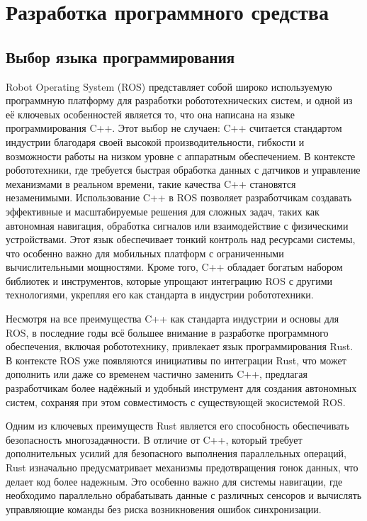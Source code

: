 \section{Разработка программного средства}

\subsection{Выбор языка программирования}
Robot Operating System (ROS) представляет собой широко используемую программную
платформу для разработки робототехнических систем, и одной из её ключевых
особенностей является то, что она написана на языке программирования C++. Этот
выбор не случаен: C++ считается стандартом индустрии благодаря своей высокой
производительности, гибкости и возможности работы на низком уровне с аппаратным
обеспечением. В контексте робототехники, где требуется быстрая обработка данных
с датчиков и управление механизмами в реальном времени, такие качества C++
становятся незаменимыми. Использование C++ в ROS позволяет разработчикам
создавать эффективные и масштабируемые решения для сложных задач, таких как
автономная навигация, обработка сигналов или взаимодействие с физическими
устройствами. Этот язык обеспечивает тонкий контроль над ресурсами системы, что
особенно важно для мобильных платформ с ограниченными вычислительными
мощностями. Кроме того, C++ обладает богатым набором библиотек и инструментов,
которые упрощают интеграцию ROS с другими технологиями, укрепляя его как
стандарта в индустрии робототехники.

Несмотря на все преимущества C++ как стандарта индустрии и основы для ROS, в
последние годы всё большее внимание в разработке программного обеспечения,
включая робототехнику, привлекает язык программирования Rust. В контексте ROS
уже появляются инициативы по интеграции Rust, что может дополнить или даже со
временем частично заменить C++, предлагая разработчикам более надёжный и удобный
инструмент для создания автономных систем, сохраняя при этом совместимость с
существующей экосистемой ROS.

Одним из ключевых преимуществ Rust является его способность обеспечивать
безопасность многозадачности. В отличие от C++, который требует дополнительных
усилий для безопасного выполнения параллельных операций, Rust изначально
предусматривает механизмы предотвращения гонок данных, что делает код более
надежным. Это особенно важно для системы навигации, где необходимо параллельно
обрабатывать данные с различных сенсоров и вычислять управляющие команды без
риска возникновения ошибок синхронизации.

